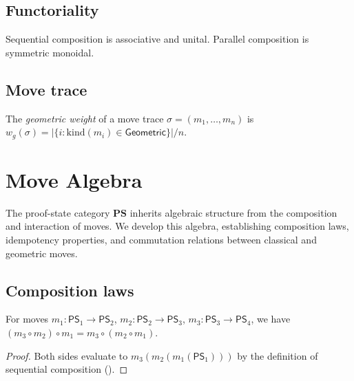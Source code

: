 \documentclass[11pt]{article}
\newcommand{\PS}{\mathsf{PS}}
\newcommand{\PScat}{\mathbf{PS}}
\newcommand{\kind}{\mathrm{kind}}
\begin{document}
\subsection{Functoriality}

\begin{theorem}[Functoriality]\label{thm:functoriality}
Sequential composition is associative and unital.
Parallel composition is symmetric monoidal.
\end{theorem}

\subsection{Move trace}

\begin{definition}\label{def:trace}
The \emph{geometric weight} of a move trace
$\sigma = (m_1, \ldots, m_n)$ is
$w_g(\sigma) = |\{i : \kind(m_i) \in \mathsf{Geometric}\}| / n$.
\end{definition}


\section{Move Algebra}\label{sec:move-algebra}

The proof-state category $\PScat$ inherits algebraic structure
from the composition and interaction of moves.  We develop this
algebra, establishing composition laws, idempotency properties,
and commutation relations between classical and geometric moves.

\subsection{Composition laws}

\begin{proposition}\label{prop:assoc}
For moves $m_1: \PS_1 \to \PS_2$, $m_2: \PS_2 \to \PS_3$,
$m_3: \PS_3 \to \PS_4$, we have
$(m_3 \circ m_2) \circ m_1 = m_3 \circ (m_2 \circ m_1)$.
\end{proposition}

\begin{proof}
Both sides evaluate to $m_3(m_2(m_1(\PS_1)))$ by the
definition of sequential composition ().
\end{proof}
\end{document}
